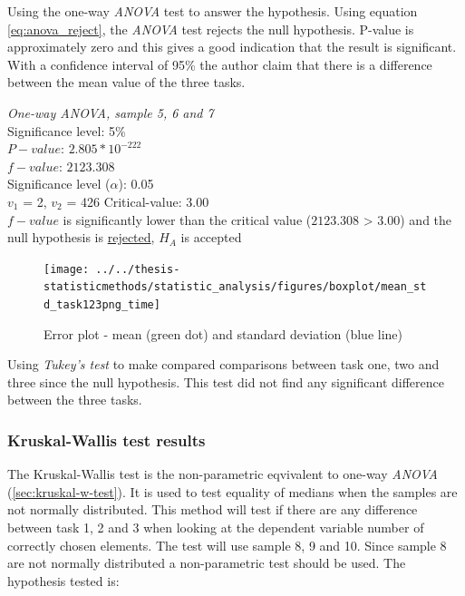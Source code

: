 Using the one-way \textit{ANOVA} test to answer the hypothesis. Using equation \ref{eq:anova_reject}, the \textit{ANOVA} test rejects the null hypothesis. P-value is approximately zero and this gives a good indication that the result is significant. With a confidence interval of 95\% the author claim that there is a difference between the mean value of the three tasks.

 \begin{center}
	\begin{tcolorbox}[box align=center,width=\textwidth-5cm]
		\centering
		\textit{One-way \textit{ANOVA}, sample 5, 6 and 7}\\
		Significance level: 5\%  \\[0.5cm]
		
		$P-value$: $2.805 * 10^{-222}$ \\
		$f-value$: $2123.308$ \\
		Significance level ($\alpha$): 0.05 \\
		$v_1$ = 2, $v_2$ = 426
		Critical-value: 3.00 \\[0.2cm] %
		
		$f-value$ is significantly lower than the critical value ($2123.308$ > $3.00$) and the null hypothesis is \underline{rejected}, $H_A$ is accepted\\[0.5cm]
	\end{tcolorbox} 
\end{center}

\begin{figure}[h!]
	\centering
	\texttt{[image: ../../thesis-statisticmethods/statistic\_analysis/figures/boxplot/mean\_std\_task123png\_time]}
	\caption{Error plot - mean (green dot) and standard deviation (blue line)}
	\label{fig:meanstdtask123pngtime}
\end{figure}

Using \textit{Tukey's test} to make compared comparisons between task one, two and three since the null hypothesis. This test did not find any significant difference between the three tasks. 

\subsubsection{Kruskal-Wallis test results}

The Kruskal-Wallis test is the non-parametric eqvivalent to one-way \textit{ANOVA} (\ref{sec:kruskal-w-test}). It is used to test equality of medians when the samples are not normally distributed. This method will test if there are any difference between task 1, 2 and 3 when looking at the dependent variable number of correctly chosen elements. The test will use sample 8, 9 and 10. Since sample 8 are not normally distributed a non-parametric test should be used. The hypothesis tested is:

